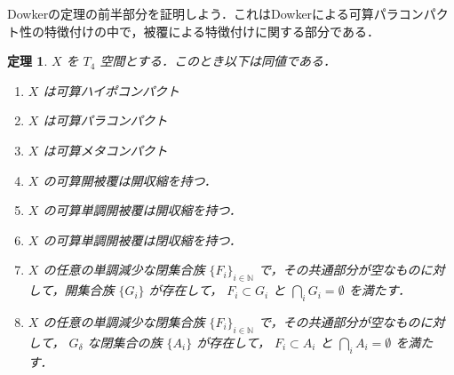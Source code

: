 \documentclass[leqno, 12pt]{ltjsarticle}
\newtheorem{thm}{定理}
\newcommand{\nn}{\mathbb{N}}
\begin{document}
Dowkerの定理の前半部分を証明しよう．これはDowkerによる可算パラコンパクト性の特徴付けの中で，被覆による特徴付けに関する部分である．
\begin{thm}\label{thm:Dowker1}
$X$
を
$T_{4}$
空間とする．このとき以下は同値である．
\begin{enumerate}[label=\textup{(\arabic*)}]
\item
$X$
は可算ハイポコンパクト
\item
$X$
は可算パラコンパクト
\item
$X$
は可算メタコンパクト
\item
$X$
の可算開被覆は開収縮を持つ．
\item
$X$
の可算単調開被覆は開収縮を持つ．
\item
$X$
の可算単調開被覆は閉収縮を持つ．
\item
$X$
の任意の単調減少な閉集合族
$\{F_{i}\}_{i\in\nn}$
で，その共通部分が空なものに対して，開集合族
$\{G_{i}\}$
が存在して，
$F_{i}\subset G_{i}$
と
$\bigcap_{i} G_{i}=\emptyset$
を満たす．
\item
$X$
の任意の単調減少な閉集合族
$\{F_{i}\}_{i\in\nn}$
で，その共通部分が空なものに対して，
$G_{\delta}$
な閉集合の族
$\{A_{i}\}$
が存在して，
$F_{i}\subset A_{i}$
と
$\bigcap_{i} A_{i}=\emptyset$
を満たす．
\end{enumerate}

\end{thm}
\end{document}
